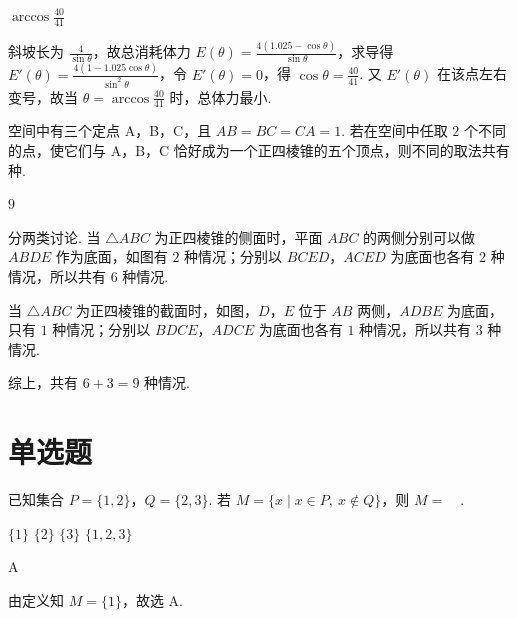 \begin{answer}
\(\arccos\frac{40}{41}\)
\end{answer}

\begin{solution}
斜坡长为 \(\frac{4}{\sin\theta}\)，故总消耗体力 \(E(\theta)=\frac{4\left(1.025-\cos\theta\right)}{\sin\theta}\)，求导得
\(E'(\theta)=\frac{4\left(1-1.025\cos\theta\right)}{\sin^2\theta}\)，令 \(E'(\theta)=0\)，得 \(\cos\theta=\frac{40}{41}\). 又 \(E'(\theta)\) 在该点左右变号，故当 \(\theta=\arccos\frac{40}{41}\) 时，总体力最小.
\end{solution}

\begin{problem}
空间中有三个定点 A，B，C，且 \(AB=BC=CA=1\). 若在空间中任取 \(2\) 个不同的点，使它们与 A，B，C 恰好成为一个正四棱锥的五个顶点，则不同的取法共有\fillinblank{} 种.
\end{problem}

\begin{answer}
\(9\)
\end{answer}

\begin{solution}
分两类讨论.
当 \(\triangle ABC\) 为正四棱锥的侧面时，平面 \(ABC\) 的两侧分别可以做 \(ABDE\) 作为底面，如图有 \(2\) 种情况；分别以 \(BCED\)，\(ACED\) 为底面也各有 \(2\) 种情况，所以共有 \(6\) 种情况.

当 \(\triangle ABC\) 为正四棱锥的截面时，如图，\(D\)，\(E\) 位于 \(AB\) 两侧，\(ADBE\) 为底面，只有 \(1\) 种情况；分别以 \(BDCE\)，\(ADCE\) 为底面也各有 \(1\) 种情况，所以共有 \(3\) 种情况.

综上，共有 \(6+3=9\) 种情况.
\end{solution}
\section{单选题}

\begin{problem}
已知集合 \(P=\{1,2\}\)，\(Q=\{2,3\}\). 若 \(M=\{x\mid x\in P,\ x\notin Q\}\)，则 \(M=\quad\).

\choices
    {\(\{1\}\)}
    {\(\{2\}\)}
    {\(\{3\}\)}
    {\(\{1,2,3\}\)}
\end{problem}

\begin{answer}
A
\end{answer}

\begin{solution}
由定义知 \(M=\{1\}\)，故选 A.
\end{solution}

